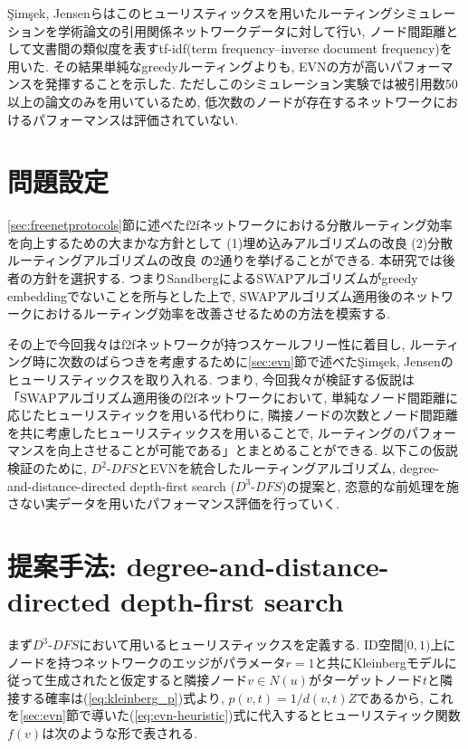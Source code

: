\documentclass[dvipdfmx]{ampbt}
\begin{document}
{\c{S}}im{\c{s}}ek, Jensenらはこのヒューリスティックスを用いたルーティングシミュレーションを学術論文の引用関係ネットワークデータに対して行い, ノード間距離として文書間の類似度を表すtf-idf(term frequency–inverse document frequency)を用いた. その結果単純なgreedyルーティングよりも, EVNの方が高いパフォーマンスを発揮することを示した. ただしこのシミュレーション実験では被引用数50以上の論文のみを用いているため, 低次数のノードが存在するネットワークにおけるパフォーマンスは評価されていない.



\section{問題設定}
\ref{sec:freenetprotocols}節に述べた\acrshort{f2f}ネットワークにおける分散ルーティング効率を向上するための大まかな方針として (1)埋め込みアルゴリズムの改良 (2)分散ルーティングアルゴリズムの改良 の2通りを挙げることができる. 本研究では後者の方針を選択する. つまりSandbergによるSWAPアルゴリズムがgreedy embeddingでないことを所与とした上で, SWAPアルゴリズム適用後のネットワークにおけるルーティング効率を改善させるための方法を模索する.

その上で今回我々は\acrshort{f2f}ネットワークが持つスケールフリー性に着目し, ルーティング時に次数のばらつきを考慮するために\ref{sec:evn}節で述べた{\c{S}}im{\c{s}}ek, Jensenのヒューリスティックスを取り入れる. つまり, 今回我々が検証する仮説は「SWAPアルゴリズム適用後の\acrshort{f2f}ネットワークにおいて, 単純なノード間距離に応じたヒューリスティックを用いる代わりに, 隣接ノードの次数とノード間距離を共に考慮したヒューリスティックスを用いることで, ルーティングのパフォーマンスを向上させることが可能である」とまとめることができる. 以下この仮説検証のために, $D^2$-$DFS$とEVNを統合したルーティングアルゴリズム, degree-and-distance-directed depth-first search ($D^3$-$DFS$)の提案と, 恣意的な前処理を施さない実データを用いたパフォーマンス評価を行っていく.

\section{提案手法: degree-and-distance-directed depth-first search}
まず$D^3$-$DFS$において用いるヒューリスティックスを定義する. ID空間$[0,1)$上にノードを持つネットワークのエッジがパラメータ$r=1$と共にKleinbergモデルに従って生成されたと仮定すると隣接ノード$v \in N(u)$がターゲットノード$t$と隣接する確率は(\ref{eq:kleinberg_p})式より, $p(v,t) = 1/d(v,t)Z$であるから, これを\ref{sec:evn}節で導いた(\ref{eq:evn-heuristic})式に代入するとヒューリスティック関数$f(v)$は次のような形で表される.
\end{document}
